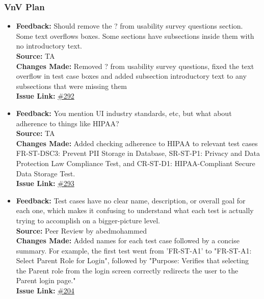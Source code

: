 \documentclass{article}
\begin{document}
\subsubsection{VnV Plan}

\begin{itemize}
    \item 
      \textbf{Feedback:} Should remove the ? from usability survey questions section. Some text overflows boxes. Some sections have subsections inside them with no introductory text.\\
      \textbf{Source:} TA \\
      \textbf{Changes Made:} Removed ? from usability survey questions, fixed the text overflow in test case boxes and added subsection introductory text to any subsections that were missing them\\
      \textbf{Issue Link:} \href{https://github.com/parishanizam/TeleHealth/issues/292}{\#292}

    \item 
      \textbf{Feedback:} You mention UI industry standards, etc, but what about adherence to things like HIPAA?\\
      \textbf{Source:} TA \\
      \textbf{Changes Made:} Added checking adherence to HIPAA to relevant test cases FR-ST-DSC3: Prevent PII Storage in Database, SR-ST-P1: Privacy and Data Protection Law Compliance Test, and CR-ST-D1: HIPAA-Compliant Secure Data Storage Test. \\
      \textbf{Issue Link:} \href{https://github.com/parishanizam/TeleHealth/issues/293}{\#293}

    \item 
      \textbf{Feedback:} Test cases have no clear name, description, or overall goal for each one, which makes it confusing to understand what each test is actually trying to accomplish on a bigger-picture level. \\
      \textbf{Source:} Peer Review by abedmohammed \\
      \textbf{Changes Made:} Added names for each test case followed by a concise summary. For example, the first test went from 'FR-ST-A1' to "FR-ST-A1: Select Parent Role for Login", followed by "Purpose: Verifies that selecting the Parent role from the login screen correctly redirects the user to the Parent login page."\\
      \textbf{Issue Link:} \href{https://github.com/parishanizam/TeleHealth/issues/204}{\#204}


\end{itemize}
\end{document}
